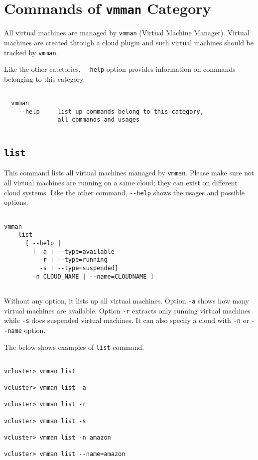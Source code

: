 \documentclass[11pt]{article}
\def \ttt{\texttt}
\def \vb{\verb}
\begin{document}
\newpage

\section{Commands of \ttt{vmman} Category}

All virtual machines are managed by \vb+vmman+ (Virtual Machine Manager). Virtual machines are created through a cloud plugin and such virtual machines should be tracked by \vb+vmman+.

Like the other catetories, \vb+--help+ option provides information on commands belonging to this category.


\begin{Verbatim}[fontfamily=courier, fontsize = \small, obeytabs
=true, tabsize=4, frame=lines]

  vmman 
    --help     list up commands belong to this category, 
               all commands and usages
  
\end{Verbatim}


\subsection{\ttt{list}}

This command lists all virtual machines managed by \vb+vmman+. Please make sure not all virtual machines are running on a same cloud; they can exist on different cloud systems. Like the other command, \vb+--help+ shows the usages and possible options.

\begin{Verbatim}[fontfamily=courier, fontsize = \small, obeytabs
=true, tabsize=4, frame=lines]

vmman 
    list 
      [ --help |
        [ -a | --type=available 
          -r | --type=running 
          -s | --type=suspended]
        -n CLOUD_NAME | --name=CLOUDNAME ] 
      
\end{Verbatim}

Without any option, it lists up all virtual machines. Option \vb+-a+ shows how many virtual machines are available. Option \vb+-r+ extracts only running virtual machines while \vb+-s+ does suspended virtual machines.  It can also specify a cloud with \vb+-n+ or \vb+--name+ option. 

The below shows examples of \vb+list+ command.

\begin{Verbatim}[fontfamily=courier, fontsize = \small, obeytabs
=true, tabsize=4, frame=lines]

vcluster> vmman list

vcluster> vmman list -a

vcluster> vmman list -r

vcluster> vmman list -s

vcluster> vmman list -n amazon

vcluster> vmman list --name=amazon

\end{Verbatim}
\end{document}
